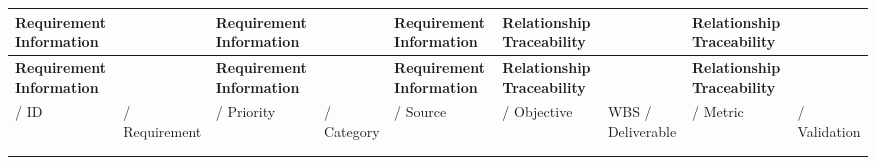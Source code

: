 \documentclass[10pt,letterpaper]{article}
\renewcommand\arraystretch{1.25}
\begin{document}
\begin{landscape}
\begin{center}
\begingroup
\setlength\tabcolsep{2.0pt}
\tiny
\renewcommand\arraystretch{1.55}
\begin{longtable}{|>{\raggedright\arraybackslash}p{0.898in}|>{\raggedright\arraybackslash}p{0.898in}|>{\raggedright\arraybackslash}p{0.898in}|>{\raggedright\arraybackslash}p{0.898in}|>{\raggedright\arraybackslash}p{0.898in}|>{\raggedright\arraybackslash}p{0.898in}|>{\raggedright\arraybackslash}p{0.898in}|>{\raggedright\arraybackslash}p{0.898in}|>{\raggedright\arraybackslash}p{0.898in}|}
\hline
\rowcolor{light}
\textbf{Requirement Information} & \rule{0pt}{11pt}\hspace{0pt} & \textbf{Requirement Information} & \rule{0pt}{11pt}\hspace{0pt} & \textbf{Requirement Information} & \textbf{Relationship Traceability} & \rule{0pt}{11pt}\hspace{0pt} & \textbf{Relationship Traceability} & \rule{0pt}{11pt}\hspace{0pt} \\ \hline
\endfirsthead
\hline\rowcolor{light} \textbf{Requirement Information} & \rule{0pt}{11pt}\hspace{0pt} & \textbf{Requirement Information} & \rule{0pt}{11pt}\hspace{0pt} & \textbf{Requirement Information} & \textbf{Relationship Traceability} & \rule{0pt}{11pt}\hspace{0pt} & \textbf{Relationship Traceability} & \rule{0pt}{11pt}\hspace{0pt} \\ \hline
\endhead
/ ID & / Requirement & / Priority & / Category & / Source & / Objective & WBS / Deliverable & / Metric & / Validation \\ \hline
\rule{0pt}{11pt}\hspace{0pt} & \rule{0pt}{11pt}\hspace{0pt} & \rule{0pt}{11pt}\hspace{0pt} & \rule{0pt}{11pt}\hspace{0pt} & \rule{0pt}{11pt}\hspace{0pt} & \rule{0pt}{11pt}\hspace{0pt} & \rule{0pt}{11pt}\hspace{0pt} & \rule{0pt}{11pt}\hspace{0pt} & \rule{0pt}{11pt}\hspace{0pt} \\ \hline
\rule{0pt}{11pt}\hspace{0pt} & \rule{0pt}{11pt}\hspace{0pt} & \rule{0pt}{11pt}\hspace{0pt} & \rule{0pt}{11pt}\hspace{0pt} & \rule{0pt}{11pt}\hspace{0pt} & \rule{0pt}{11pt}\hspace{0pt} & \rule{0pt}{11pt}\hspace{0pt} & \rule{0pt}{11pt}\hspace{0pt} & \rule{0pt}{11pt}\hspace{0pt} \\ \hline

\end{longtable}
\end{center}
\end{landscape}
\end{document}
